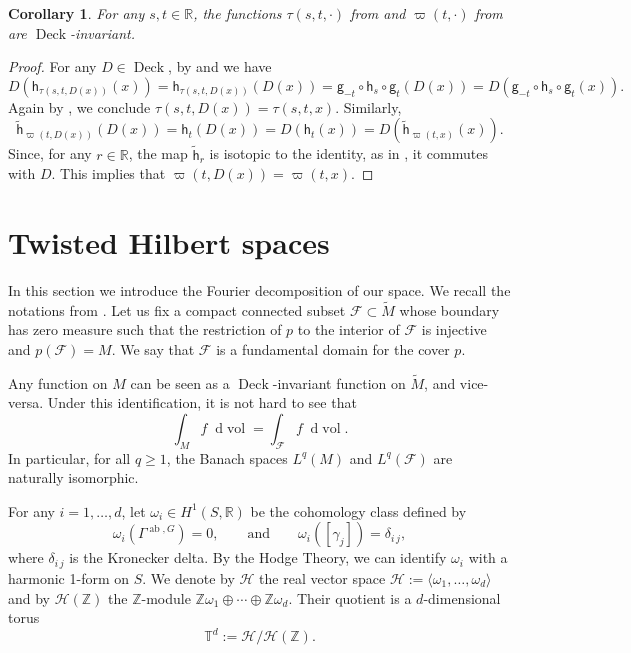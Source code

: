 \documentclass[11pt,letterpaper]{amsart}
\newcommand \cF {{\mathcal F}}
\newcommand \cH {{\mathcal H}}
\newcommand \R {{ \mathbb R}}
\newcommand \Z {{ \mathbb Z}}
\newcommand \T {{ \mathbb T}}
\newcommand \tM {{\widetilde M}}
\newcommand{\horo}{\mathsf{h}}
\newcommand{\geo}{\mathsf{g}}
\newcommand*{\diff}{\mathop{}\!\mathrm{d}}
\DeclareMathOperator{\vol}{vol}
\DeclareMathOperator{\Deck}{Deck}
\DeclareMathOperator{\abel}{ab}
\newtheorem{corollary}[theorem]{Corollary}
\theoremstyle{definition}
\begin{document}
\begin{corollary}\label{cor:Jt_invariant}
For any $s,t \in \R$, the functions $\tau(s,t,\cdot)$ from  and $\varpi(t,\cdot)$ from  are $\Deck$-invariant.
\end{corollary}
\begin{proof}
For any $D \in \Deck$, by  and  we have
\[
D(\horo_{\tau(s,t,D(x))}(x)) = \horo_{\tau(s,t,D(x))}(D(x)) = \geo_{-t} \circ \horo_s \circ \geo_t(D(x)) = D(\geo_{-t} \circ \horo_s \circ \geo_t(x)).
\]
Again by , we conclude $\tau(s,t,D(x)) = \tau(s,t,x)$. Similarly,
\[
\widetilde{\horo}_{\varpi(t,D(x))}(D(x)) = \horo_t(D(x)) = D(\horo_t(x)) = D(\widetilde{\horo}_{\varpi(t,x)}(x)).
\]
Since, for any $r\in \R$, the map $\widetilde{\horo}_r$ is isotopic to the identity, as in , it commutes with $D$. This implies that $\varpi(t,D(x)) = \varpi(t,x)$.
\end{proof}




\section{Twisted Hilbert spaces}\label{sec:twisted_hilbert_spaces}
In this section we introduce the Fourier decomposition of our space. We recall the notations from . 
Let us fix a compact connected subset $\cF \subset \tM$ whose boundary has zero measure such that the restriction of $p$ to the interior of $\cF$ is injective and $p(\cF) = M$. We say that $\cF$ is a fundamental domain for the cover $p$.

Any function on $M$ can be seen as a $\Deck$-invariant function on $\tM$, and vice-versa. Under this identification, it is not hard to see that 
\[
\int_M f \diff \vol = \int_{\cF} f \diff \vol.
\]
In particular, for all $q\geq 1$, the Banach spaces $L^q(M)$ and $L^q(\cF)$ are naturally isomorphic.

For any $i=1,\dots, d$, let $\omega_i \in H^1(S,\R)$ be the cohomology class defined by
\[
\omega_i(\Gamma^{\abel, G})=0, \qquad \text{and} \qquad \omega_i([\gamma_j]) = \delta_{i \, j},
\]
where $ \delta_{i \, j}$ is the Kronecker delta. 
By the Hodge Theory, we can identify $\omega_i$ with a harmonic 1-form on $S$. We denote by $\mathcal{H}$ the real vector space 
$\cH := \langle \omega_1, \dots, \omega_d \rangle$ and by $\cH(\Z)$ the $\Z$-module $\Z\omega_1 \oplus \cdots \oplus \Z \omega_d$. Their quotient is a $d$-dimensional torus
\[
\T^d := \cH / \cH(\Z).
\]
\end{document}
